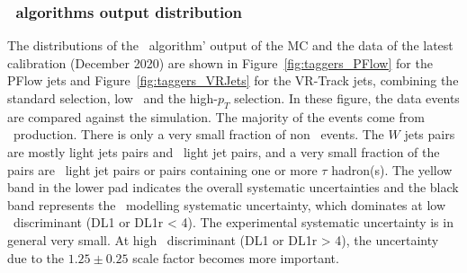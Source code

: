 \documentclass[letterpaper,12pt]{article}
\begin{document}
\subsubsection{\btagging\ algorithms output distribution}
The distributions of the \btagging\ algorithm' output of 
the MC and the data of the latest calibration 
(December 2020) are shown in Figure~\ref{fig:taggers_PFlow} for the PFlow jets and 
Figure~\ref{fig:taggers_VRJets} for the VR-Track jets, 
combining the standard selection, low \pt\ and the high-$p_T$ selection. 
In these figure, the data events are compared against the simulation.
The majority of the events come from \ttbar\ production. There is only
a very small fraction of non \ttbar\ events. The $W$ jets pairs are mostly light jets 
pairs and \cjet\ light jet pairs, and a very small fraction of the pairs are 
\bjet\ light jet pairs or pairs containing one or more $\tau$ hadron(s). 
The yellow band in the lower pad indicates the overall systematic uncertainties
and the black band represents the \ttbar\ modelling systematic uncertainty, 
which dominates at low \btagging\ discriminant (DL1 or DL1r < 4). 
The experimental systematic uncertainty is in general very small. 
At high \btagging\ discriminant (DL1 or DL1r > 4), the
uncertainty due to the $1.25 \pm 0.25$ scale factor 
becomes more important. 
\end{document}
